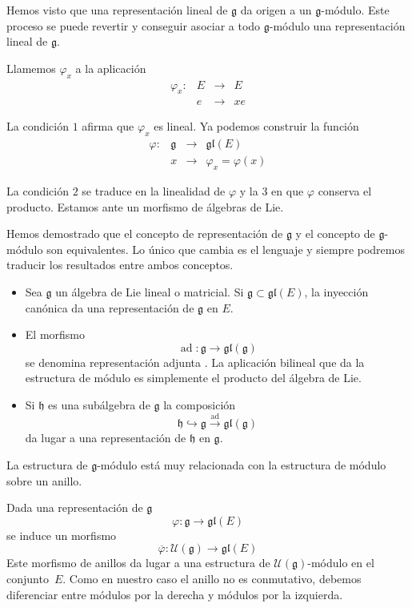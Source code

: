 \documentclass[a4paper,draft,12pt]{scrartcl}
\newcommand{\g}{\mathfrak{g}}%
\newcommand{\uni}{\mathcal{U}}%
\newcommand{\lto}{\longrightarrow}%
\newcommand{\df}[1]{\textsf{\color{blue}#1}}
\DeclareMathOperator{\ad}{ad}  %
\begin{document}
Hemos visto que una representación lineal de $\g$ da origen a un $\g$-módulo.  Este proceso se  puede revertir y conseguir asociar a todo $\g$-módulo una representación lineal de $\g$.

Llamemos $\varphi_x$ a la aplicación
$$
\begin{array}{cccl}
\varphi_x :&  E & \lto & E \\
  & e & \lto & xe
\end{array}
$$

La condición $1$ afirma que $\varphi_x$ es lineal. Ya podemos construir la función
$$
\begin{array}{cccl}
\varphi :&  \g & \lto & \mathfrak{gl}(E) \\
  & x & \lto & \varphi_x=\varphi(x)
\end{array}
$$

La condición $2$ se traduce en la linealidad de $\varphi$ y la $3$ en que $\varphi$ conserva el producto.  Estamos ante un morfismo de álgebras de Lie.

Hemos demostrado que el concepto de representación de $\g$ y el concepto de $\g$-módulo son equivalentes.  Lo único que cambia es el lenguaje y siempre podremos traducir los resultados entre ambos conceptos.

\bigskip


\begin{itemize}

\item Sea $\g$ un álgebra de Lie lineal o matricial.  Si $\g \subset \mathfrak{gl}(E)$, la inyección canónica  da una representación de $\g$ en $E$.

\item El morfismo
$$
\ad: \g \lto \mathfrak{gl}(\g)
$$
se denomina   \df{representación adjunta} .  La aplicación bilineal que da la estructura de módulo es simplemente el producto del álgebra de Lie.

\item Si $\mathfrak{h}$ es una subálgebra de $\g$ la composición
$$
\mathfrak{h} \hookrightarrow \g \stackrel{\ad}{\lto} \mathfrak{gl}(\g)
$$
da lugar a una representación de $\mathfrak{h}$ en $\g$.

\end{itemize}

La estructura de $\g$-módulo está muy relacionada con la estructura de módulo sobre un anillo.  

Dada una representación de $\g$
$$
\varphi: \g \lto \mathfrak{gl}(E)
$$
se induce un morfismo
$$
\overline{\varphi}: \uni (\g) \lto \mathfrak{gl}(E)
$$
Este morfismo de anillos da lugar a una estructura de $\uni(\g)$-módulo en el conjunto~$E$.  Como en nuestro caso el anillo no es conmutativo, debemos diferenciar entre módulos por la derecha y módulos por la izquierda.
\end{document}
